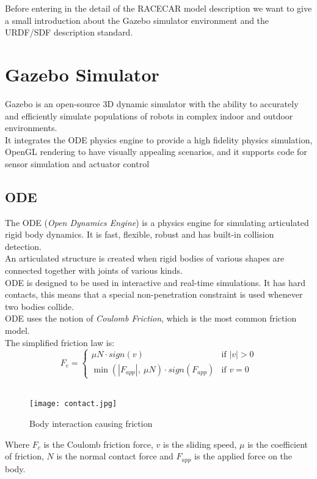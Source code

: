 Before entering in the detail of the RACECAR model description we want to give a small introduction about the Gazebo 
simulator environment and the URDF/SDF description standard.

\section{Gazebo Simulator}
Gazebo is an open-source 3D dynamic simulator with the ability to accurately and efficiently simulate populations
of robots in complex indoor and outdoor environments. \\ 
It integrates the ODE physics engine to provide a high fidelity physics simulation, OpenGL rendering to have visually
appealing scenarios, and it supports code for sensor simulation and actuator control

\subsection{ODE}
The ODE (\textit{Open Dynamics Engine}) is a physics engine for simulating articulated rigid body dynamics.
It is fast, flexible, robust and has built-in collision detection.\\
An articulated structure is created when rigid bodies of various shapes are connected together with joints of various kinds.\\
ODE is designed to be used in interactive and real-time simulations. It has hard contacts, this means that a special 
non-penetration constraint is used whenever two bodies collide. \\
ODE uses the notion of \textit{Coulomb Friction}, which is the most common friction model. \\
The simplified friction law is: 
\[
F_c = \begin{cases} 
        \mu N \cdot sign(v) & \text{if $|v|>0$} \\
        \min(|F_{app}|,\ \mu N) \cdot sign(F_{app}) & \text{if $v=0$}
      \end{cases}
\] \\

\begin{figure}[H]
    \texttt{[image: contact.jpg]}
    \caption{Body interaction causing friction}
\end{figure}

Where $F_c$ is the Coulomb friction force, $v$ is the sliding speed, $\mu$ is the coefficient of friction, $N$ is the 
normal contact force and $F_{app}$ is the applied force on the body. \\

